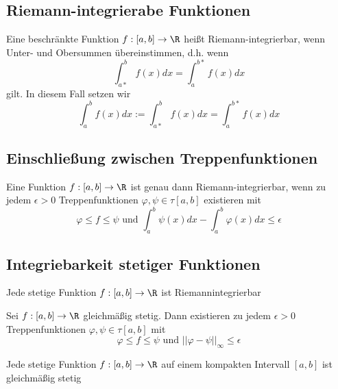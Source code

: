 	\subsection{Riemann-integrierabe Funktionen}
		\begin{Definition} 
			Eine beschränkte Funktion $f:[a, b]\to\R$ heißt Riemann-integrierbar, wenn Unter- und Obersummen übereinstimmen, d.h. wenn
			$$
				\int_{a*}^bf(x)dx=\int_a^{b*}f(x)dx
			$$
			gilt. In diesem Fall setzen wir
			$$
				\int_a^bf(x)dx:=\int_{a*}^bf(x)dx=\int_a^{b*}f(x)dx
			$$
		\end{Definition}
	\subsection{Einschließung zwischen Treppenfunktionen}
		\begin{Satz} [ ]
			Eine Funktion $f:[a, b]\to \R$ ist genau dann Riemann-integrierbar, wenn zu jedem $\epsilon>0$ Treppenfunktionen $\varphi, \psi\in\tau[a, b]$ existieren mit
			$$
				\varphi\leq f\leq\psi \text{ und } \int_a^b\psi(x)dx-\int_a^b\varphi(x)dx\leq\epsilon
			$$
		\end{Satz}
	\subsection{Integriebarkeit stetiger Funktionen}
		\begin{Satz} [ ]
			Jede stetige Funktion $f:[a, b]\to\R$ ist Riemannintegrierbar
		\end{Satz}
		\begin{Satz} [ ]
			Sei $f: [a, b]\to\R$ gleichmäßig stetig. Dann existieren zu jedem $\epsilon>0$ Treppenfunktionen $\varphi,\psi\in\tau[a, b]$ mit
			$$
				\varphi\leq f\leq\psi \text{ und } ||\varphi-\psi||_\infty\leq\epsilon
			$$
		\end{Satz}
		\begin{Satz} [ ]
			Jede stetige Funktion $f:[a, b]\to\R$ auf einem kompakten Intervall $[a, b]$ ist gleichmäßig stetig
		\end{Satz}

		
		
		
		
		
		
		
